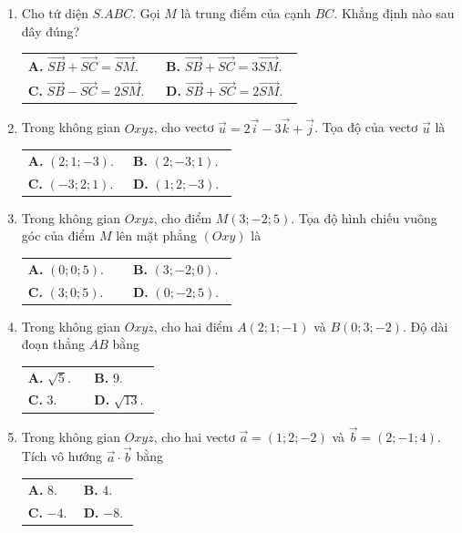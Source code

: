 \documentclass[12pt,a4paper]{article}
\makeatletter
\newcommand{\bonpa}[4]{\par\nobreak\smallskip\nobreak\noindent
\begin{tabular}{@{}p{0.47\linewidth}p{0.47\linewidth}@{}}
\textbf{A.} #1 & \textbf{B.} #2\\[8pt]
\textbf{C.} #3 & \textbf{D.} #4\end{tabular}}
\makeatother
\begin{document}
\begin{enumerate}[start=8]
\item Cho tứ diện $S.ABC$. Gọi $M$ là trung điểm của cạnh $BC$. Khẳng định nào sau đây đúng?
\bonpa{$\overrightarrow{SB}+\overrightarrow{SC}=\overrightarrow{SM}$.}{$\overrightarrow{SB}+\overrightarrow{SC}=3\overrightarrow{SM}$.}{$\overrightarrow{SB}-\overrightarrow{SC}=2\overrightarrow{SM}$.}{$\overrightarrow{SB}+\overrightarrow{SC}=2\overrightarrow{SM}$.}

\item Trong không gian $Oxyz$, cho vectơ $\vec u=2\vec i-3\vec k+\vec j$. Tọa độ của vectơ $\vec u$ là
\bonpa{$(2;1;-3)$.}{$(2;-3;1)$.}{$(-3;2;1)$.}{$(1;2;-3)$.}

\item Trong không gian $Oxyz$, cho điểm $M(3;-2;5)$. Tọa độ hình chiếu vuông góc của điểm $M$ lên mặt phẳng $(Oxy)$ là
\bonpa{$(0;0;5)$.}{$(3;-2;0)$.}{$(3;0;5)$.}{$(0;-2;5)$.}

\item Trong không gian $Oxyz$, cho hai điểm $A(2;1;-1)$ và $B(0;3;-2)$. Độ dài đoạn thẳng $AB$ bằng
\bonpa{$\sqrt5$.}{$9$.}{$3$.}{$\sqrt{13}$.}

\item Trong không gian $Oxyz$, cho hai vectơ $\vec a=(1;2;-2)$ và $\vec b=(2;-1;4)$. Tích vô hướng $\vec a\cdot\vec b$ bằng
\bonpa{$8$.}{$4$.}{$-4$.}{$-8$.}
\end{enumerate}
\end{document}
